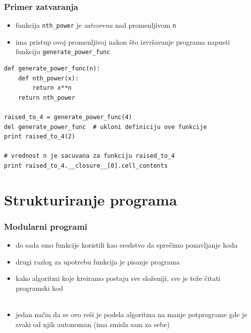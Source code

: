 \documentclass[compress]{beamer}
\begin{document}
\begin{frame}[fragile]
  \frametitle{Primer zatvaranja}
  \begin{itemize}
    \item funkcija \texttt{nth\_power} je \textit{zatvorena} nad promenljivom \texttt{n}
    \item ima pristup ovoj promenljivoj nakon što izvršavanje programa napusti funkciju \texttt{generate\_power\_func}
    \end{itemize}
\begin{verbatim}
def generate_power_func(n):
    def nth_power(x):
        return x**n
    return nth_power

raised_to_4 = generate_power_func(4)
del generate_power_func  # ukloni definiciju ove funkcije
print raised_to_4(2)

# vrednost n je sacuvana za funkciju raised_to_4
print raised_to_4.__closure__[0].cell_contents  
\end{verbatim}
\end{frame}

\section{Strukturiranje programa}

\begin{frame}[fragile]
  \frametitle{Modularni programi}
  \begin{itemize}
    \item do sada smo funkcije koristili kao sredstvo da sprečimo ponavljanje koda
    \item drugi razlog za upotrebu funkcija je pisanje  programa
    \item kako algoritmi koje kreiramo postaju sve složeniji, sve je teže čitati programski kod \\ \ \\
    \item jedan način da se ovo reši je podela algoritma na manje potprograme gde je svaki od njih autonoman (ima smisla sam za sebe)
  \end{itemize}
\end{frame}
\end{document}
